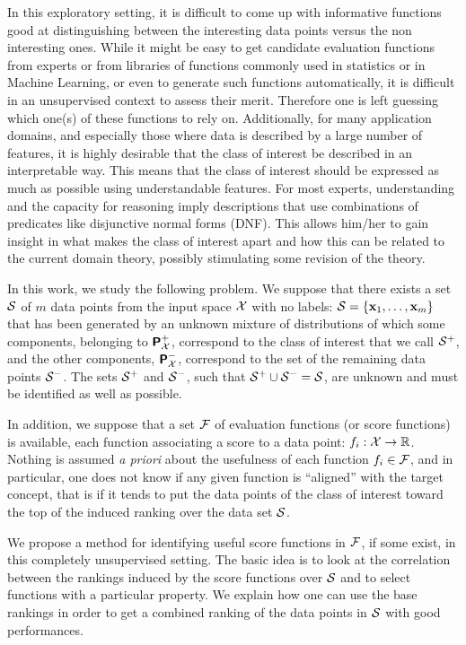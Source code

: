 \documentclass[twocolumn,english]{article}
\newcommand{\Prob}{\textbf{\textsf{\textup{P}}}}  %
\newcommand{\Reel}{\mathbb{R}}                           %
\begin{document}
In this exploratory setting, it is difficult to come up with informative functions good at distinguishing between the interesting data points versus the non interesting ones. While it might be easy to get candidate evaluation functions from experts or from libraries of functions commonly used in statistics or in Machine Learning, or even to generate such functions automatically, it is difficult in an unsupervised context to assess their merit. Therefore one is left guessing which one(s) of these functions to rely on. Additionally, for many application domains, and especially those where data is described by a large number of features, it is highly desirable that the class of interest be described in an interpretable way. This means that the class of interest should be expressed as much as possible using understandable features. For most experts, understanding and the capacity for reasoning imply descriptions that use combinations of predicates like disjunctive normal forms (DNF). This allows him/her to gain insight in what makes the class of interest apart and how this can be related to the current domain theory, possibly stimulating some revision of the theory. 

\smallskip
In this work, we study the following problem. We suppose that there exists a set ${\cal S}$ of $m$ data points from the input space ${\cal X}$ with no labels: ${\cal S} = \{{\mathbf x}_1, \ldots, {\mathbf x}_m\}$ that has been generated by an unknown mixture of distributions of which some components, belonging to $\Prob_{\cal X}^+$, correspond to the class of interest that we call ${\cal S}^+$, and the other components, $\Prob_{\cal X}^-$, correspond to the set of the remaining data points ${\cal S}^-$. The sets ${\cal S}^+$ and ${\cal S}^-$, such that ${\cal S}^+ \cup {\cal S}^- = {\cal S}$, are unknown and must be identified as well as possible.

In addition, we suppose that a set ${\cal F}$ of evaluation functions (or score functions) is available, each function associating a score to a data point: $f_i : {\cal X} \rightarrow \Reel$. Nothing is assumed \textit{a priori} about the usefulness of each function $f_i \in {\cal F}$, and in particular, one does not know if any given function is ``aligned'' with the target concept, that is if it tends to put the data points of the class of interest toward the top of the induced ranking over the data set ${\cal S}$. 

We propose a method for identifying useful score functions in ${\cal F}$, if some exist, in this completely unsupervised setting. The basic idea is to look at the correlation between the rankings induced by the score functions over ${\cal S}$ and to select functions with a particular property. We explain how one can use the base rankings in order to get a combined ranking of the data points in ${\cal S}$ with good performances. 
\end{document}
